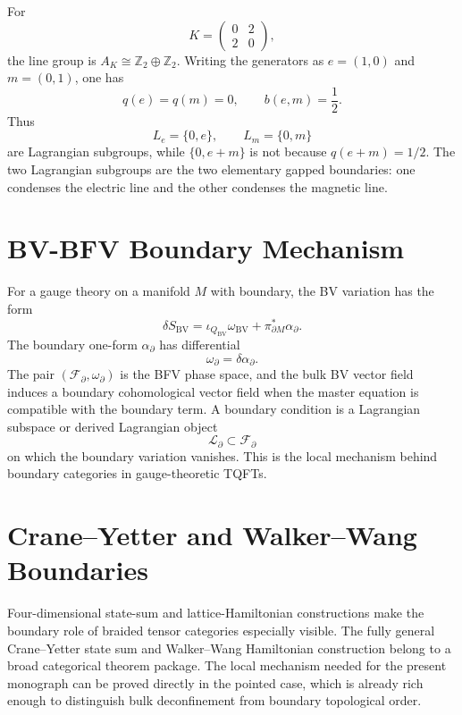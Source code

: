 \begin{example}
\label{ex:toric-code-lagrangian-boundaries}
For
\[
  K=\begin{pmatrix}0&2\\2&0\end{pmatrix},
\]
the line group is \(A_K\cong\mathbb Z_2\oplus\mathbb Z_2\).  Writing the
generators as \(e=(1,0)\) and \(m=(0,1)\), one has
\[
  q(e)=q(m)=0,
  \qquad
  b(e,m)=\frac12 .
\]
Thus
\[
  L_e=\{0,e\},
  \qquad
  L_m=\{0,m\}
\]
are Lagrangian subgroups, while \(\{0,e+m\}\) is not because
\(q(e+m)=1/2\).  The two Lagrangian subgroups are the two elementary gapped
boundaries: one condenses the electric line and the other condenses the
magnetic line.
\end{example}

\section{BV-BFV Boundary Mechanism}

For a gauge theory on a manifold \(M\) with boundary, the BV variation has the
form
\[
  \delta S_{\mathrm{BV}}
  =
  \iota_{Q_{\mathrm{BV}}}\omega_{\mathrm{BV}}
  +
  \pi_{\partial M}^*\alpha_{\partial}.
\]
The boundary one-form \(\alpha_{\partial}\) has differential
\[
  \omega_{\partial}=\delta\alpha_{\partial}.
\]
The pair \((\mathcal F_{\partial},\omega_{\partial})\) is the BFV phase
space, and the bulk BV vector field induces a boundary cohomological vector
field when the master equation is compatible with the boundary term.  A
boundary condition is a Lagrangian subspace or derived Lagrangian object
\[
  \mathcal L_{\partial}\subset\mathcal F_{\partial}
\]
on which the boundary variation vanishes.  This is the local mechanism behind
boundary categories in gauge-theoretic TQFTs.

\section{Crane--Yetter and Walker--Wang Boundaries}

Four-dimensional state-sum and lattice-Hamiltonian constructions make the
boundary role of braided tensor categories especially visible.  The fully
general Crane--Yetter state sum and Walker--Wang Hamiltonian construction
belong to a broad categorical theorem package.  The local mechanism needed
for the present monograph can be proved directly in the pointed case, which
is already rich enough to distinguish bulk deconfinement from boundary
topological order.

